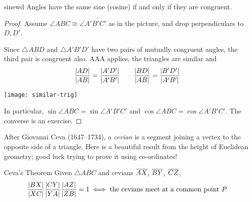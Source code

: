 \begin{thm}{}{sinewd}
	Angles have the same sine (cosine) if and only if they are congruent.
\end{thm}


\begin{proof}
	Assume $\angle ABC\cong\angle A'B'C'$ as in the picture, and drop perpendiculars to $D,D'$.\par
	\begin{minipage}[t]{0.56\linewidth}\vspace{-8pt}
		Since $\triangle ABD$ and $\triangle A'B'D'$ have two pairs of mutually congruent angles, the third pair is congruent also. AAA applies, the triangles are similar and
		\[
			\frac{\left| AD\right|}{\left| AB\right|}=\frac{\left| A'D'\right|}{\left| A'B'\right|}\qquad \frac{\left| BD\right|}{\left| AB\right|}=\frac{\left| B'D'\right|}{\left| A'B'\right|}
		\]
	\end{minipage}
	\hfill
	\begin{minipage}[t]{0.43\linewidth}\vspace{-8pt}
		\flushright
		\texttt{[image: similar-trig]}
	\end{minipage}\smallbreak
	In particular, $\sin\angle ABC=\sin\angle A'B'C'$ and $\cos\angle ABC=\cos\angle A'B'C'$.\smallbreak
	The converse is an exercise.
\end{proof}


After Giovanni Ceva (1647--1734), a \emph{cevian} is a segment joining a vertex to the opposite side of a triangle. Here is a beautiful result from the height of Euclidean geometry; good luck trying to prove it using co-ordinates!

\begin{thm}{Ceva's Theorem}{}
	Given $\triangle ABC$ and cevians $\overline{AX}$, $\overline{BY}$, $\overline{CZ}$,
	\[
		\frac{\left| BX\right|}{\left| XC\right|}\frac{\left| CY\right|}{\left| YA\right|}\frac{\left| AZ\right|}{\left| ZB\right|}=1\iff\text{the cevians meet at a common point $P$}
	\] 
\end{thm}

